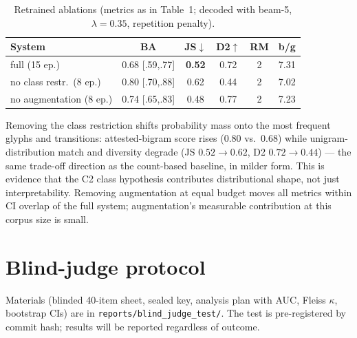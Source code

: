 \documentclass[10pt,twocolumn]{article}
\newcommand{\Ctwo}{\textsf{C2}}
\begin{document}
\begin{table}[h]
\centering
\small
\caption{Retrained ablations (metrics as in Table~1; decoded with
beam-5, $\lambda=0.35$, repetition penalty).}
\begin{tabular}{lccccc}
\toprule
System & BA & JS$\downarrow$ & D2$\uparrow$ & RM & b/g\\
\midrule
full (15 ep.) & 0.68 [.59,.77] & \textbf{0.52} & 0.72 & 2 & 7.31\\
no class restr.\ (8 ep.) & 0.80 [.70,.88] & 0.62 & 0.44 & 2 & 7.02\\
no augmentation (8 ep.) & 0.74 [.65,.83] & 0.48 & 0.77 & 2 & 7.23\\
\bottomrule
\end{tabular}
\end{table}

Removing the class restriction shifts probability mass onto the most
frequent glyphs and transitions: attested-bigram score rises
(0.80 vs.\ 0.68) while unigram-distribution match and diversity
degrade (JS $0.52\to0.62$, D2 $0.72\to0.44$) --- the same trade-off
direction as the count-based baseline, in milder form. This is
evidence that the \Ctwo{} class hypothesis contributes distributional
shape, not just interpretability. Removing augmentation at equal
budget moves all metrics within CI overlap of the full system;
augmentation's measurable contribution at this corpus size is small.

\section{Blind-judge protocol}
\label{app:judges}

Materials (blinded 40-item sheet, sealed key, analysis plan with AUC,
Fleiss $\kappa$, bootstrap CIs) are in
\texttt{reports/blind\_judge\_test/}. The test is pre-registered by
commit hash; results will be reported regardless of outcome.
\end{document}
